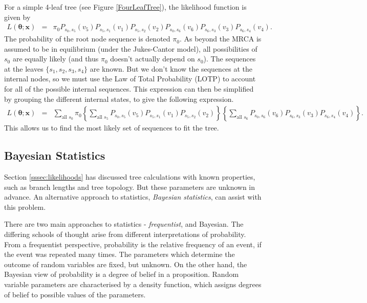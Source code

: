\documentclass[12pt]{article}
\begin{document}
For a simple 4-leaf tree (see Figure \ref{FourLeafTree}), the likelihood function is given by
\begin{eqnarray*}
L(\bm{\theta};\bm{x}) &=& \pi_0 P_{s_0,s_5}(v_5) P_{s_5,s_1}(v_1) P_{s_5,s_2}(v_2) P_{s_0,s_6}(v_6) P_{s_6,s_3}(v_3) P_{s_6,s_4}(v_4).
\end{eqnarray*}
The probability of the root node sequence is denoted $\pi_0$. As beyond the MRCA is assumed to be in equilibrium (under the Jukes-Cantor model), all possibilities of $s_0$ are equally likely (and thus $\pi_0$ doesn't actually depend on $s_0$). The sequences at the leaves $\{s_1,s_2,s_3,s_4\}$ are known. But we don't know the sequences at the internal nodes, so we must use the Law of Total Probability (LOTP) to account for all of the possible internal sequences. This expression can then be simplified by grouping the different internal states, to give the following expression.
\begin{eqnarray*}
L(\bm{\theta};\bm{x}) &=& \sum_{\text{all }s_0} \pi_0 \left\{ \sum_{\text{all }s_5} P_{s_0,s_5}(v_5) P_{s_5,s_1}(v_1) P_{s_5,s_2}(v_2) \right\} \left\{\sum_{\text{all }s_6} P_{s_0,s_6}(v_6) P_{s_6,s_3}(v_3) P_{s_6,s_4}(v_4) \right\}.
\end{eqnarray*}
This allows us to find the most likely set of sequences to fit the tree.

\subsection{Bayesian Statistics}\label{ssec:bayesian}


Section \ref{sssec:likelihoods} has discussed tree calculations with known properties, such as branch lengths and tree topology. But these parameters are unknown in advance. An alternative approach to statistics, \emph{Bayesian statistics}, can assist with this problem.

There are two main approaches to statistics - \emph{frequentist}, and Bayesian. The differing schools of thought arise from different interpretations of probability. From a frequentist perspective, probability is the relative frequency of an event, if the event was repeated many times. The parameters which determine the outcome of random variables are fixed, but unknown. On the other hand, the Bayesian view of probability is a degree of belief in a proposition. Random variable parameters are characterised by a density function, which assigns degrees of belief to possible values of the parameters.
\end{document}
